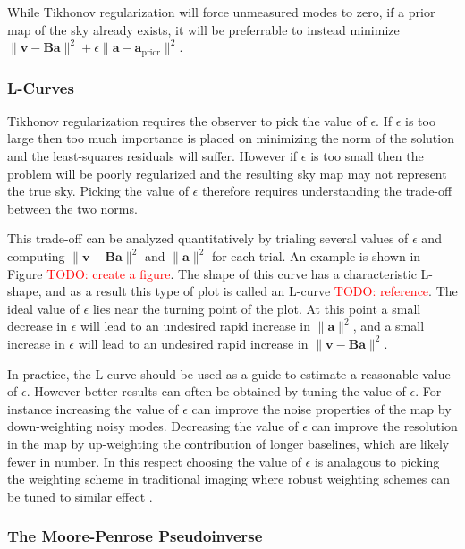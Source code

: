 \documentclass[twocolumn]{aastex6}
\renewcommand{\b}{\pmb}
\newcommand{\todo}[1]{\textcolor{red}{TODO: #1}\PackageWarning{TODO:}{#1!}}
\begin{document}
While Tikhonov regularization will force unmeasured modes to zero, if a prior map of the sky already
exists, it will be preferrable to instead minimize $\|\b v - \b B\b a\|^2 + \epsilon \|\b a-\b
a_\text{prior}\|^2$.

\subsubsection{L-Curves}

Tikhonov regularization requires the observer to pick the value of $\epsilon$. If $\epsilon$ is too
large then too much importance is placed on minimizing the norm of the solution and the
least-squares residuals will suffer. However if $\epsilon$ is too small then the problem will be
poorly regularized and the resulting sky map may not represent the true sky. Picking the value of
$\epsilon$ therefore requires understanding the trade-off between the two norms.

This trade-off can be analyzed quantitatively by trialing several values of $\epsilon$ and computing
$\|\b v - \b B\b a\|^2$ and $\|\b a\|^2$ for each trial. An example is shown in Figure \todo{create
a figure}. The shape of this curve has a characteristic L-shape, and as a result this type of plot
is called an L-curve \todo{reference}. The ideal value of $\epsilon$ lies near the turning point of
the plot. At this point a small decrease in $\epsilon$ will lead to an undesired rapid increase in
$\|\b a\|^2$, and a small increase in $\epsilon$ will lead to an undesired rapid increase in $\|\b v
- \b B\b a\|^2$.

In practice, the L-curve should be used as a guide to estimate a reasonable value of $\epsilon$.
However better results can often be obtained by tuning the value of $\epsilon$. For instance
increasing the value of $\epsilon$ can improve the noise properties of the map by down-weighting
noisy modes. Decreasing the value of $\epsilon$ can improve the resolution in the map by
up-weighting the contribution of longer baselines, which are likely fewer in number. In this respect
choosing the value of $\epsilon$ is analagous to picking the weighting scheme in traditional
imaging where robust weighting schemes can be tuned to similar effect \citep{briggs}.

\subsubsection{The Moore-Penrose Pseudoinverse}
\end{document}
